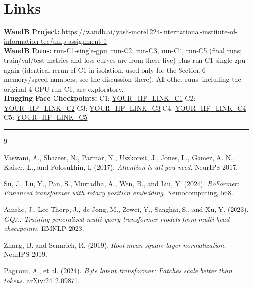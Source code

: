 \documentclass[12pt,a4paper]{article}
\begin{document}
\section{Links}

\small
\textbf{WandB Project:} \url{https://wandb.ai/yash-more1224-international-institute-of-information-tec/anlp-assignment-1} \\
\textbf{WandB Runs:} run-C1-single-gpu, run-C2, run-C3, run-C4, run-C5 (final runs; train/val/test metrics and loss curves are from these five) plus run-C1-single-gpu-again (identical rerun of C1 in isolation, used only for the Section 6 memory/speed numbers; see the discussion there). All other runs, including the original 4-GPU run-C1, are exploratory. \\
\textbf{Hugging Face Checkpoints:} C1: \url{YOUR_HF_LINK_C1} \; C2: \url{YOUR_HF_LINK_C2} \; C3: \url{YOUR_HF_LINK_C3} \; C4: \url{YOUR_HF_LINK_C4} \; C5: \url{YOUR_HF_LINK_C5}
\normalsize

\vspace{3pt}
\hrule
\vspace{2pt}

\begin{thebibliography}{9}

Vaswani, A., Shazeer, N., Parmar, N., Uszkoreit, J., Jones, L., Gomez, A. N., Kaiser, L., and Polosukhin, I. (2017).
\textit{Attention is all you need}.
NeurIPS 2017.

Su, J., Lu, Y., Pan, S., Murtadha, A., Wen, B., and Liu, Y. (2024).
\textit{RoFormer: Enhanced transformer with rotary position embedding}.
Neurocomputing, 568.

Ainslie, J., Lee-Thorp, J., de Jong, M., Zewei, Y., Sanghai, S., and Xu, Y. (2023).
\textit{GQA: Training generalized multi-query transformer models from multi-head checkpoints}.
EMNLP 2023.

Zhang, B. and Sennrich, R. (2019).
\textit{Root mean square layer normalization}.
NeurIPS 2019.

Pagnoni, A., et al. (2024).
\textit{Byte latent transformer: Patches scale better than tokens}.
arXiv:2412.09871.

\end{thebibliography}
\end{document}
